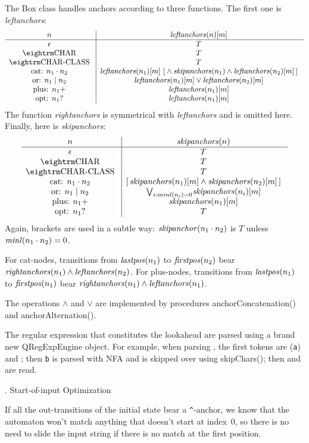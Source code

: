The {\sf Box} class handles anchors according to three functions. The first one
is {\it leftanchors\/}:
  $$\vbox{\halign{\g{#}\vrule && \g{$#$} \cr
    $n$                   & {\it leftanchors}(n)[m] \cr
  \noalign{\hrule}
    $\epsilon$            & T \cr
    \tok{char}            & T \cr
    \tok{char-class}      & T \cr
    cat: $n_1 \cdot n_2$  & {\it leftanchors}(n_1)[m] \ [{} \land {\it skipanchors}(n_1) \land {\it leftanchors}(n_2)[m]\,] \cr
    or: $n_1 \mid n_2$    & {\it leftanchors}(n_1)[m] \lor {\it leftanchors}(n_2)[m] \cr
    plus: $n_1+$          & {\it leftanchors}(n_1)[m] \cr
    opt: $n_1?$           & {\it leftanchors}(n_1)[m] \cr
  }}$$
The function {\it rightanchors\/} is symmetrical with {\it leftanchors} and is
omitted here. Finally, here is {\it skipanchors\/}:
  $$\vbox{\halign{\g{#}\vrule && \g{$#$} \cr
    $n$                   & {\it skipanchors}(n) \cr
  \noalign{\hrule}
    $\epsilon$            & T \cr
    \tok{char}            & T \cr
    \tok{char-class}      & T \cr
    cat: $n_1 \cdot n_2$  & [\,{\it skipanchors}(n_1)[m] \land {\it skipanchors}(n_2)[m]\,] \cr
    or: $n_1 \mid n_2$    & \smash{\bigvee_{i:{minl}(n_i)=0}} {\it skipanchors}(n_i)[m] \cr
    plus: $n_1+$          & {\it skipanchors}(n_1)[m] \cr
    opt: $n_1?$           & T \cr
  }}$$
Again, brackets are used in a subtle way: ${\it skipanchor}(n_1 \cdot n_2)$ is
$T$ unless ${\it minl}(n_1 \cdot n_2) = 0$.

For cat-nodes, transitions from ${\it lastpos}(n_1)$ to ${\it firstpos}(n_2)$
bear ${\it rightanchors}(n_1) \land {\it leftanchors}(n_2)$. For plus-nodes,
transitions from ${\it lastpos}(n_1)$ to ${\it firstpos}(n_1)$ bear ${\it
rightanchors}(n_1) \land {\it leftanchors}(n_1)$.

The operations $\land$ and $\lor$ are implemented by procedures {\sf
anchorConcatenation()} and {\sf anchorAlternation()}.

The regular expression that constitutes the lookahead are parsed using a brand
new {\sf QRegExpEngine} object. For example, when parsing , the
first tokens are  ({\tt a}) and ; then {\tt b} is parsed
with NFA and is skipped over using {\sf skipChars()}; then \lex{)} and 
are read.

. Start-of-input Optimization

If all the out-transitions of the initial state bear a {\tt\^}-anchor, we know
that the automaton won't match anything that doesn't start at index~$0$, so
there is no need to slide the input string if there is no match at the first
position.


